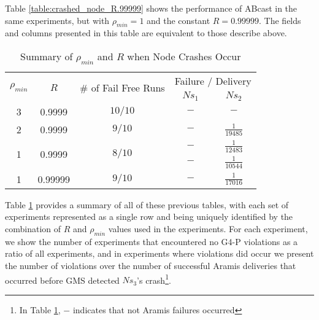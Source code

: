     Table \ref{table:crashed_node_R.99999} shows the performance of \textsf{ABcast} in the same experiments, but with $\rho_{min} = 1$ and the constant $R = 0.99999$.  The fields and columns presented in this table are equivalent to those describe above.  
    
    \begin{table}[h]
  \begin{center}
  \renewcommand{\arraystretch}{1.5}
    \begin{tabular}{|c|c|c|c|c|}
    \hline
    \multirow{2}{*}{$\rho_{min}$} & \multirow{2}{*}{$R$}    & \multirow{2}{1.75cm}{$\#$ of Fail Free Runs} & \multicolumn{2}{|c|}{Failure / Delivery} \\ \cline{4-5}
                                 &              &                   & $Ns_1$   & $Ns_2$             \\ \hline \hline
    3                           & 0.9999  & $10/10$    & $-$        & $-$                 \\ \hline
    2                           & 0.9999  & $9/10$      & $-$        & $\frac{1}{19485}$ \\ \hline
    \multirow{2}{*}{1} & \multirow{2}{*}{0.9999} & \multirow{2}{*}{$8/10$} & $-$ & $\frac{1}{12483}$ \\ 
                                 &              &                   & $-$        & $\frac{1}{10544}$ \\ \hline
    1                           &0.99999 & $9/10$      & $-$        & $\frac{1}{17016}$ \\ \hline
    \end{tabular}
    \caption{Summary of $\rho_{min}$ and $R$ when Node Crashes Occur}
    \label{table:crashed_node_summary}
  \end{center}
\end{table}    
    
    Table \ref{table:crashed_node_summary} provides a summary of all of these previous tables, with each set of experiments represented as a single row and being uniquely identified by the combination of $R$ and $\rho_{min}$ values used in the experiments.  For each experiment, we show the number of experiments that encountered no G4-P violations as a ratio of all experiments, and in experiments where violations did occur we present the number of violations over the number of successful \textsf{Aramis} deliveries that occurred before GMS detected $Ns_3$'s crash\footnote{In Table \ref{table:crashed_node_summary}, $-$ indicates that not \textsf{Aramis} failures occurred}.  
     

